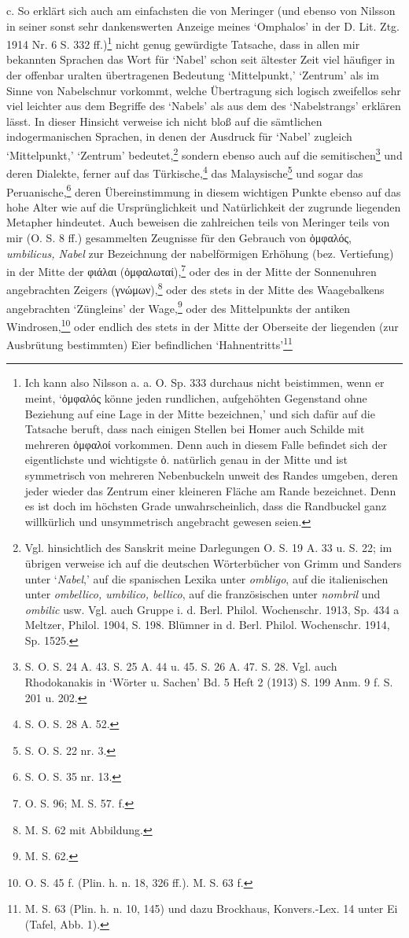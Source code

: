 \documentclass[a4paper, 11pt, oneside]{article}
\begin{document}
c. So erklärt sich auch am einfachsten die von Meringer (und ebenso von Nilsson in seiner sonst sehr dankenswerten Anzeige meines `Omphalos' in der D. Lit. Ztg. 1914 Nr. 6 S. 332 ff.)\footnote{Ich kann also Nilsson a. a. O. Sp. 333 durchaus nicht beistimmen, wenn er meint, `ὀμφαλός könne jeden rundlichen, aufgehöhten Gegenstand ohne Beziehung auf eine Lage in der Mitte bezeichnen,' und sich dafür auf die Tatsache beruft, dass nach einigen Stellen bei Homer auch Schilde mit mehreren ὀμφαλοί vorkommen. Denn auch in diesem Falle befindet sich der eigentlichste und wichtigste ὀ. natürlich genau in der Mitte und ist symmetrisch von mehreren Nebenbuckeln unweit des Randes umgeben, deren jeder wieder das Zentrum einer kleineren Fläche am Rande bezeichnet. Denn es ist doch im höchsten Grade unwahrscheinlich, dass die Randbuckel ganz willkürlich und unsymmetrisch angebracht gewesen seien.} nicht genug gewürdigte Tatsache, dass in allen mir bekannten Sprachen das Wort für `Nabel' schon seit ältester Zeit viel häufiger in der offenbar uralten übertragenen Bedeutung `Mittelpunkt,' `Zentrum' als im Sinne von Nabelschnur vorkommt, welche Übertragung sich logisch zweifellos sehr viel leichter aus dem Begriffe des `Nabels' als aus dem des `Nabelstrangs' erklären lässt. In dieser Hinsicht verweise ich nicht bloß auf die sämtlichen indogermanischen Sprachen, in denen der Ausdruck für `Nabel' zugleich `Mittelpunkt,' `Zentrum' bedeutet,\footnote{Vgl. hinsichtlich des Sanskrit meine Darlegungen O. S. 19 A. 33 u. S. 22; im übrigen verweise ich auf die deutschen Wörterbücher von Grimm und Sanders unter `\emph{Nabel},' auf die spanischen Lexika unter \emph{ombligo}, auf die italienischen unter \emph{ombellico, umbilico, bellico}, auf die französischen unter \emph{nombril} und \emph{ombilic} usw. Vgl. auch Gruppe i. d. Berl. Philol. Wochenschr. 1913, Sp. 434 a Meltzer, Philol. 1904, S. 198. Blümner in d. Berl. Philol. Wochenschr. 1914, Sp. 1525.} sondern ebenso auch auf die semitischen\footnote{S. O. S. 24 A. 43. S. 25 A. 44 u. 45. S. 26 A. 47. S. 28. Vgl. auch Rhodokanakis in `Wörter u. Sachen' Bd. 5 Heft 2 (1913) S. 199 Anm. 9 f. S. 201 u. 202.} und deren Dialekte, ferner auf das Türkische,\footnote{S. O. S. 28 A. 52.} das Malaysische\footnote{S. O. S. 22 nr. 3.} und sogar das Peruanische,\footnote{S. O. S. 35 nr. 13.} deren Übereinstimmung in diesem wichtigen Punkte ebenso auf das hohe Alter wie auf die Ursprünglichkeit und Natürlichkeit der zugrunde liegenden Metapher hindeutet. Auch beweisen die zahlreichen teils von Meringer teils von mir (O. S. 8 ff.) gesammelten Zeugnisse für den Gebrauch von ὀμφαλός, \emph{umbilicus, Nabel} zur Bezeichnung der nabelförmigen Erhöhung (bez. Vertiefung) in der Mitte der φιάλαι (ὀμφαλωταί),\footnote{O. S. 96; M. S. 57. f.} oder des in der Mitte der Sonnenuhren angebrachten Zeigers (γνώμων),\footnote{M. S. 62 mit Abbildung.} oder des stets in der Mitte des Waagebalkens angebrachten `Züngleins' der Wage,\footnote{M. S. 62.} oder des Mittelpunkts der antiken Windrosen,\footnote{O. S. 45 f. (Plin. h. n. 18, 326 ff.). M. S. 63 f.} oder endlich des stets in der Mitte der Oberseite der liegenden (zur Ausbrütung bestimmten) Eier befindlichen `Hahnentritts'\footnote{M. S. 63 (Plin. h. n. 10, 145) und dazu Brockhaus, Konvers.-Lex. 14 unter Ei (Tafel, Abb. 1).} 
\end{document}
